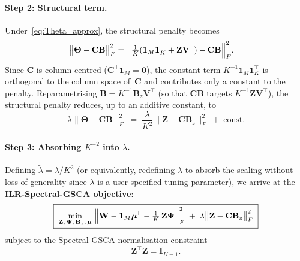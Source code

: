 \documentclass{article}
\begin{document}
\paragraph{Step 2: Structural term.}
Under~\eqref{eq:Theta_approx}, the structural penalty becomes
\begin{align}
  \bigl\|\boldsymbol{\Theta} - \mathbf{C}\mathbf{B}\bigr\|_F^2
  &= \Bigl\|
    \tfrac{1}{K}(\mathbf{1}_M\mathbf{1}_K^{\!\top}
    + \mathbf{Z}\mathbf{V}^{\!\top})
    - \mathbf{C}\mathbf{B}
  \Bigr\|_F^2.
  \label{eq:structural_expanded}
\end{align}
Since $\mathbf{C}$ is column-centred ($\mathbf{C}^{\!\top}\mathbf{1}_M
= \mathbf{0}$), the constant term
$K^{-1}\mathbf{1}_M\mathbf{1}_K^{\!\top}$ is orthogonal to the column
space of~$\mathbf{C}$ and contributes only a constant to the penalty.
Reparametrising
$\mathbf{B} = K^{-1}\mathbf{B}_z\mathbf{V}^{\!\top}$ (so that
$\mathbf{C}\mathbf{B}$ targets $K^{-1}\mathbf{Z}\mathbf{V}^{\!\top}$),
the structural penalty reduces, up to an additive constant, to
\begin{equation}
  \lambda\bigl\|\boldsymbol{\Theta}
    - \mathbf{C}\mathbf{B}\bigr\|_F^2
  \;=\;
  \frac{\lambda}{K^2}
  \bigl\|\mathbf{Z} - \mathbf{C}\mathbf{B}_z\bigr\|_F^2
  \;+\;\text{const.}
  \label{eq:structural_ilr}
\end{equation}

\paragraph{Step 3: Absorbing $K^{-2}$ into $\lambda$.}
Defining $\tilde{\lambda}=\lambda/K^2$ (or equivalently, redefining
$\lambda$ to absorb the scaling without loss of generality since
$\lambda$ is a user-specified tuning parameter), we arrive at the
\textbf{ILR-Spectral-GSCA objective}:
%
\begin{equation}
  \boxed{\;
  \min_{\mathbf{Z},\,\boldsymbol{\Psi},\,\mathbf{B}_z,\,\boldsymbol{\mu}}\;
  \Bigl\|
    \mathbf{W}
    - \mathbf{1}_M\boldsymbol{\mu}^{\!\top}
    - \tfrac{1}{K}\,\mathbf{Z}\boldsymbol{\Psi}
  \Bigr\|_F^2
  \;+\;
  \lambda
  \bigl\|\mathbf{Z} - \mathbf{C}\mathbf{B}_z\bigr\|_F^2
  \;}
  \label{eq:objective}
\end{equation}
%
subject to the Spectral-GSCA normalisation constraint
\begin{equation}
  \mathbf{Z}^{\!\top}\mathbf{Z} = \mathbf{I}_{K-1}.
  \label{eq:constraint}
\end{equation}
\end{document}
